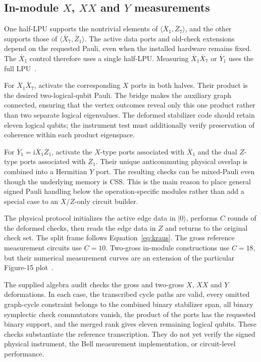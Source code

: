 \documentclass[11pt,a4paper]{article}
\newcommand{\lx}{\overline{X}}
\newcommand{\lz}{\overline{Z}}
\newcommand{\ly}{\overline{Y}}
\begin{document}
\subsection{In-module \texorpdfstring{$X$, $XX$ and $Y$}{X, XX and Y} measurements}

One half-LPU supports the nontrivial elements of $\langle\lx_1,\lz_7\rangle$, and the other supports those of $\langle\lx_7,\lz_1\rangle$. The active data ports and old-check extensions depend on the requested Pauli, even when the installed hardware remains fixed. The $\lx_1$ control therefore uses a single half-LPU. Measuring $\lx_1\lx_7$ or $\ly_1$ uses the full LPU~\cite{tdg}.

For $\lx_1\lx_7$, activate the corresponding $X$ ports in both halves. Their product is the desired two-logical-qubit Pauli. The bridge makes the auxiliary graph connected, ensuring that the vertex outcomes reveal only this one product rather than two separate logical eigenvalues. The deformed stabilizer code should retain eleven logical qubits; the instrument test must additionally verify preservation of coherence within each product eigenspace.

For $\ly_1=\mathrm{i}\lx_1\lz_1$, activate the $X$-type ports associated with $\lx_1$ and the dual $Z$-type ports associated with $\lz_1$. Their unique anticommuting physical overlap is combined into a Hermitian $Y$ port. The resulting checks can be mixed-Pauli even though the underlying memory is CSS. This is the main reason to place general signed Pauli handling below the operation-specific modules rather than add a special case to an $X/Z$-only circuit builder.

The physical protocol initializes the active edge data in $\lvert0\rangle$, performs $C$ rounds of the deformed checks, then reads the edge data in $Z$ and returns to the original check set. The split frame follows Equation~\eqref{eq:kraus}. The gross reference measurement circuits use $C=10$. Two-gross in-module constructions use $C=18$, but their numerical measurement curves are an extension of the particular Figure-15 plot~\cite{tdg}.

The supplied algebra audit checks the gross and two-gross $X$, $XX$ and $Y$ deformations. In each case, the transcribed cycle paths are valid, every omitted graph-cycle constraint belongs to the combined binary stabilizer span, all binary symplectic check commutators vanish, the product of the ports has the requested binary support, and the merged rank gives eleven remaining logical qubits. These checks substantiate the reference transcription. They do not yet verify the signed physical instrument, the Bell measurement implementation, or circuit-level performance.
\end{document}

